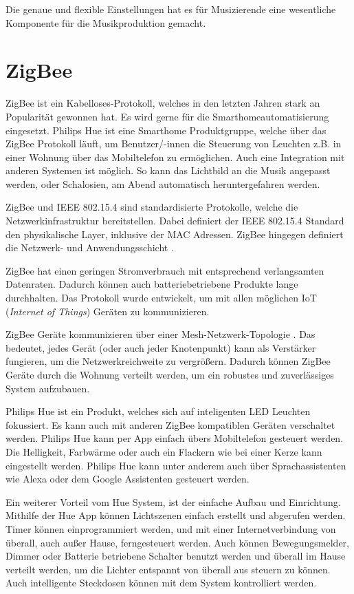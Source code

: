 Die genaue und flexible Einstellungen hat es für Musizierende eine wesentliche Komponente für die Musikproduktion gemacht.


\section{ZigBee}
ZigBee ist ein Kabelloses-Protokoll, welches in den letzten Jahren stark an Popularität gewonnen hat. Es wird gerne für die Smarthomeautomatisierung eingesetzt. Philips Hue ist eine Smarthome Produktgruppe, welche über das ZigBee Protokoll läuft, um Benutzer/-innen die Steuerung von Leuchten z.B. in einer Wohnung über das Mobiltelefon zu ermöglichen. Auch eine Integration mit anderen Systemen ist möglich. So kann das Lichtbild an die Musik angepasst werden, oder Schalosien, am Abend automatisch heruntergefahren werden.

ZigBee und IEEE 802.15.4 sind standardisierte Protokolle, welche die Netzwerkinfrastruktur bereitstellen. Dabei definiert der IEEE 802.15.4 Standard den physikalische Layer, inklusive der MAC Adressen. ZigBee hingegen definiert die Netzwerk- und Anwendungsschicht \cite[S.5]{GettingStartedWithZigBee}.

ZigBee hat einen geringen Stromverbrauch mit entsprechend verlangsamten Datenraten. Dadurch können auch batteriebetriebene Produkte lange durchhalten. Das Protokoll wurde entwickelt, um mit allen möglichen IoT (\emph{Internet of Things}) Geräten zu kommunizieren.

ZigBee Geräte kommunizieren über einer Mesh-Netzwerk-Topologie \cite[S.10]{GettingStartedWithZigBee}. Das bedeutet, jedes Gerät (oder auch jeder Knotenpunkt) kann als Verstärker fungieren, um die Netzwerkreichweite zu vergrößern. Dadurch können ZigBee Geräte durch die Wohnung verteilt werden, um ein robustes und zuverlässiges System aufzubauen.

Philips Hue ist ein Produkt, welches sich auf inteligenten LED Leuchten fokussiert. Es kann auch mit anderen ZigBee kompatiblen Geräten verschaltet werden. Philips Hue kann per App einfach übers Mobiltelefon gesteuert werden. Die Helligkeit, Farbwärme oder auch ein Flackern wie bei einer Kerze kann eingestellt werden. Philips Hue kann unter anderem auch über Sprachassistenten wie Alexa oder dem Google Assistenten gesteuert werden.

Ein weiterer Vorteil vom Hue System, ist der einfache Aufbau und Einrichtung. Mithilfe der Hue App können Lichtszenen einfach erstellt und abgerufen werden. Timer können einprogrammiert werden, und mit einer Internetverbindung von überall, auch außer Hause, ferngesteuert werden. Auch können Bewegungsmelder, Dimmer oder Batterie betriebene Schalter benutzt werden und überall im Hause verteilt werden, um die Lichter entspannt von überall aus steuern zu können. Auch intelligente Steckdosen können mit dem System kontrolliert werden. 

